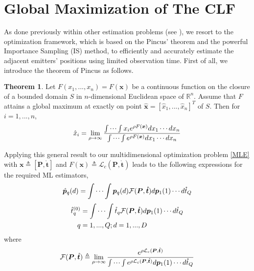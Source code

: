 \documentclass[review]{elsarticle}
\begin{document}
\section{Global Maximization of The CLF}
As done previously within other estimation problems (see \cite{ISdoa2008,Kay2000Mean,Saha2002Maximum,Wang2010Maximum,Chen2008Joint}), we resort to the optimization framework, which is based on the Pincus' theorem and the powerful Importance Sampling (IS) method, to efficiently and accurately estimate the adjacent emitters' positions using limited observation time.
First of all, we introduce the theorem of Pincus \cite{Pincus1968A} as follows.
\theoremstyle{definition} \newtheorem{Theorem}{Theorem}
\begin{Theorem}
    Let $F(x_1,...,x_n)=F(\boldsymbol{x})$ be a continuous function on the closure of a bounded domain $S$ in $n$-dimensional Euclidean space of $\mathbb{R}^n$. Assume that $F$ attains a global maximum at exactly on point $\hat{\boldsymbol{x}}=[\hat{x}_1,...,\hat{x}_n]^T$ of $S$. Then for $i=1,...,n$,
    \begin{align}
    \hat{x}_i=\lim_{\rho\to \infty}\frac{\idotsint x_i e^{\rho F(\boldsymbol{x})}dx_1\cdots dx_n}{\idotsint e^{\rho F(\boldsymbol{x})}dx_1\cdots dx_n}
    \end{align}
\end{Theorem}
Applying this general result to our multidimensional optimization problem \eqref{MLE} with $\boldsymbol{x}\triangleq[\boldsymbol{P},\mathring{\boldsymbol{t}}]$ and $F(\boldsymbol{x})\triangleq \mathcal{L}_c(\boldsymbol{P},\mathring{\boldsymbol{t}})$ leads to the following expressions for the required ML estimators,
\begin{align}\label{MI1}
    \hat{\boldsymbol{p}}_q(d)=\idotsint \boldsymbol{p}_q(d) \mathcal{F}(\boldsymbol{P},\mathring{\boldsymbol{t}})d\boldsymbol{p}_1(1) \cdots d\mathring{t}_Q
\end{align}
\begin{align}\label{MI2}    
    \hat{t}_q^{(0)}&=\idotsint \mathring{t}_q \mathcal{F}(\boldsymbol{P},\mathring{\boldsymbol{t}})d\boldsymbol{p}_1(1) \cdots d\mathring{t}_Q\\ 
    q&=1,...,Q;d=1,...,D \nonumber
\end{align}
where 
\begin{align}\label{gc}
    \mathcal{F}(\boldsymbol{P},\mathring{\boldsymbol{t}})\triangleq\lim_{\rho\to \infty}\frac{e^{\rho \mathcal{L}_c(\boldsymbol{P},\mathring{\boldsymbol{t}})}}{\idotsint e^{\rho \mathcal{L}_c(\boldsymbol{P},\mathring{\boldsymbol{t}})}d\boldsymbol{p}_1(1) \cdots d\mathring{t}_Q}
\end{align}
\end{document}
